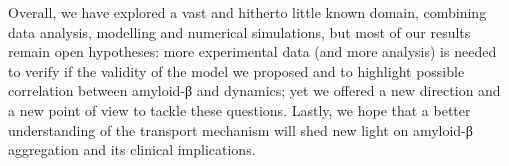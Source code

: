 Overall, we have explored a vast and hitherto little known domain, combining data analysis, modelling and numerical simulations, but most of our results remain open hypotheses: more experimental data (and more analysis) is needed to verify if the validity of the  model we proposed and to highlight possible correlation between amyloid-β and  dynamics; yet we offered a new direction and a new point of view to tackle these questions. Lastly, we hope that a better understanding of the  transport mechanism will shed new light on amyloid-β aggregation and its clinical implications.
